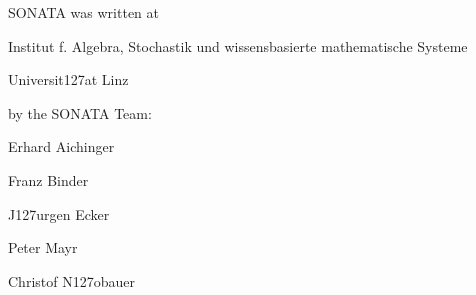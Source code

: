 
SONATA was written at
\begingroup
\smallskip \parindent3pc \parskip 0pt
\item{} Institut f. Algebra, Stochastik und wissensbasierte mathematische
        Systeme
\item{} Universit\accent127at Linz
\endgroup

by the SONATA Team:

\begingroup
\smallskip \parindent3pc \parskip 0pt
\item{} Erhard Aichinger
\item{} Franz Binder
\item{} J\accent127urgen Ecker
\item{} Peter Mayr
\item{} Christof N\accent127obauer
\endgroup



